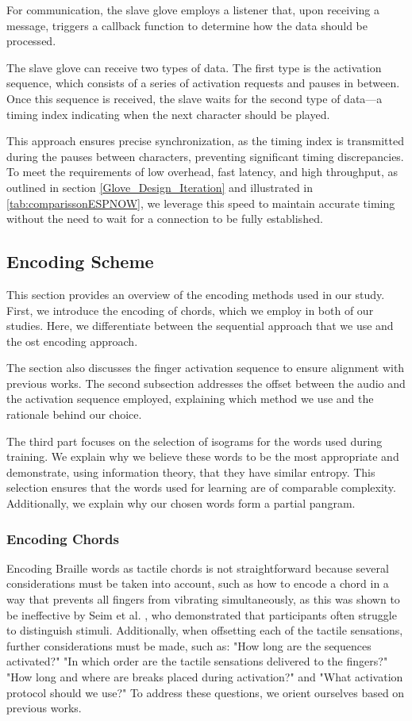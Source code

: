 For communication, the slave glove employs a listener that, upon receiving a message, triggers a callback function to determine how the data should be processed.

The slave glove can receive two types of data. The first type is the activation sequence, which consists of a series of activation requests and pauses in between. Once this sequence is received, the slave waits for the second type of data—a timing index indicating when the next character should be played.

This approach ensures precise synchronization, as the timing index is transmitted during the pauses between characters, preventing significant timing discrepancies. To meet the requirements of low overhead, fast latency, and high throughput, as outlined in section \ref{Glove_Design_Iteration} 
and illustrated in \autoref{tab:comparissonESPNOW}, we leverage this speed to maintain accurate timing without the need to wait for a connection to be fully established.

\subsection{Encoding Scheme}
This section provides an overview of the encoding methods used in our study. First, we introduce the encoding of chords, which we employ in both of our studies. Here, we differentiate between the sequential approach that we use and the \gls{ost} encoding approach.

The section also discusses the finger activation sequence to ensure alignment with previous works. The second subsection addresses the offset between the audio and the activation sequence employed, explaining which method we use and the rationale behind our choice.

The third part focuses on the selection of isograms for the words used during training. We explain why we believe these words to be the most appropriate and demonstrate, using information theory, that they have similar entropy. This selection ensures that the words used for learning are of comparable complexity. Additionally, we explain why our chosen words form a partial pangram.


\subsubsection{Encoding Chords}
Encoding Braille words as tactile chords is not straightforward because several considerations must be taken into account, such as how to encode a chord in a way that prevents all fingers from vibrating simultaneously, as this was shown to be ineffective by Seim et al. \cite{Seim2014}, who demonstrated that participants often struggle to distinguish stimuli. Additionally, when offsetting each of the tactile sensations, further considerations must be made, such as: "How long are the sequences activated?" "In which order are the tactile sensations delivered to the fingers?" "How long and where are breaks placed during activation?" and "What activation protocol should we use?" To address these questions, we orient ourselves based on previous works.

